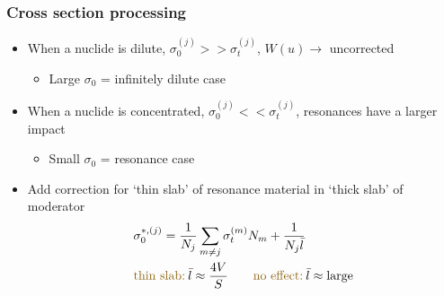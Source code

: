 \documentclass[xcolor=x11names,compress]{beamer}
\renewcommand{\(}{\begin{columns}}
\renewcommand{\)}{\end{columns}}
\newcommand{\<}[1]{\begin{column}{#1}}
\renewcommand{\>}{\end{column}}
\begin{document}
	
\begin{frame}[fragile]
  \frametitle{Cross section processing}

	\begin{itemize}
	\item When a nuclide is dilute, $\sigma_0^{(j)} >>
	 \sigma_t^{(j)}$, $W(u) \rightarrow$ uncorrected 
		\begin{itemize}
		\item Large $\sigma_0$ = infinitely dilute case	
		\end{itemize}

	\item When a nuclide is concentrated, $\sigma_0^{(j)} << 
	 \sigma_t^{(j)}$, resonances have a larger impact 
		\begin{itemize}
		\item Small $\sigma_0$ = resonance case	
		\end{itemize}
	\end{itemize}

    \pause	
	\begin{itemize}
	\item Add correction for `thin slab' of resonance material in 
	`thick slab' of moderator
	\begin{align}
  	&\sigma_0^{*,(j)} = \frac{1}{N_j} \sum_{m \ne j} \sigma_{t}^{(m)} N_m 
	+ \frac{1}{N_j \bar{l}} \nonumber\\
  	&\text{\textcolor{byellow}{thin slab:}}\:\bar{l} \approx \frac{4V}{S} \qquad \text{\textcolor{byellow}{no effect:}}\:\bar{l} \approx \text{large} \nonumber
	\end{align}
	\end{itemize}
  
\end{frame}
\end{document}
